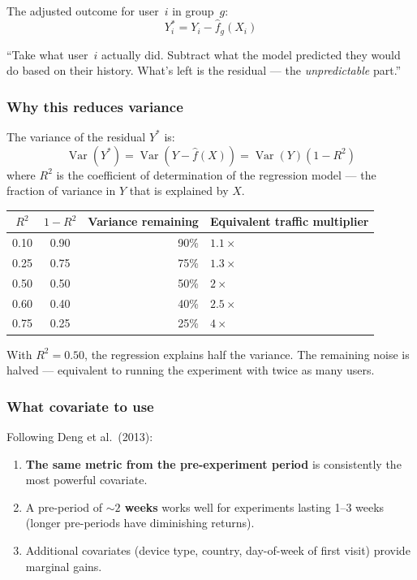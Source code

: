 \documentclass[12pt, a4paper]{article}
\newcommand{\Var}{\operatorname{Var}}
\begin{document}
The adjusted outcome for user~$i$ in group~$g$:
\[
  \boxed{Y^*_i = Y_i - \hat{f}_g(X_i)}
\]

\begin{plainlanguage}
``Take what user~$i$ actually did.  Subtract what the model predicted they
would do based on their history.  What's left is the residual --- the
\emph{unpredictable} part.''
\end{plainlanguage}

\subsubsection*{Why this reduces variance}

The variance of the residual $Y^*$ is:
\[
  \Var(Y^*) = \Var(Y - \hat{f}(X)) = \Var(Y)(1 - R^2)
\]
where $R^2$ is the coefficient of determination of the regression model ---
the fraction of variance in $Y$ that is explained by $X$.

\begin{center}
\begin{tabular}{@{} c c r l @{}}
\toprule
$R^2$ & $1-R^2$
       & \textbf{Variance remaining} & \textbf{Equivalent traffic multiplier} \\
\midrule
0.10  & 0.90 & 90\%  & $1.1\times$ \\
0.25  & 0.75 & 75\%  & $1.3\times$ \\
0.50  & 0.50 & 50\%  & $2\times$ \\
0.60  & 0.40 & 40\%  & $2.5\times$ \\
0.75  & 0.25 & 25\%  & $4\times$ \\
\bottomrule
\end{tabular}
\end{center}

\begin{plainlanguage}
With $R^2 = 0.50$, the regression explains half the variance.  The
remaining noise is halved --- equivalent to running the experiment with twice
as many users.
\end{plainlanguage}

\subsubsection*{What covariate to use}

Following Deng et al.\ (2013):
\begin{enumerate}[nosep]
  \item \textbf{The same metric from the pre-experiment period} is
        consistently the most powerful covariate.
  \item A pre-period of \textbf{$\sim\!2$ weeks} works well for experiments
        lasting 1--3 weeks (longer pre-periods have diminishing returns).
  \item Additional covariates (device type, country, day-of-week of first
        visit) provide marginal gains.
\end{enumerate}
\end{document}
